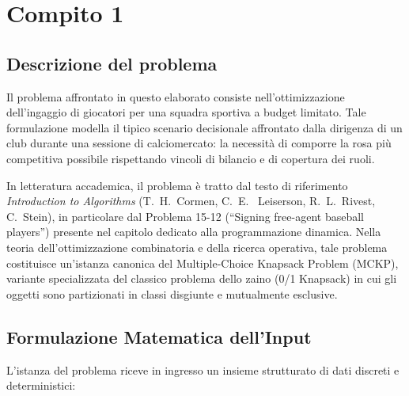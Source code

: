 \documentclass{cisXXX} %
\date{Elaborato a.a. 2025/26 \\[0.3em] Prof.ssa Marina Zanella}
\begin{document}
\maketitle

\section*{Compito 1}                                                                           
\subsection{Descrizione del problema}                                                                                                                                                                               
Il problema affrontato in questo elaborato consiste nell'ottimizzazione dell'ingaggio di giocatori per una squadra sportiva a budget      
limitato. Tale formulazione modella il tipico scenario decisionale affrontato dalla dirigenza di un club durante una sessione di            
calciomercato: la necessità di comporre la rosa più competitiva possibile rispettando vincoli di bilancio e di copertura dei ruoli.         
																																			
In letteratura accademica, il problema è tratto dal testo di riferimento \textit{Introduction to Algorithms} (T.~H.~Cormen, C.~E.         
~Leiserson, R.~L.~Rivest, C.~Stein), in particolare dal Problema 15-12 (``Signing free-agent baseball players'') presente nel capitolo      
dedicato alla programmazione dinamica. Nella teoria dell'ottimizzazione combinatoria e della ricerca operativa, tale problema costituisce   
un'istanza canonica del Multiple-Choice Knapsack Problem (MCKP), variante specializzata del classico problema dello zaino (0/1 Knapsack) in 
cui gli oggetti sono partizionati in classi disgiunte e mutualmente esclusive.

\subsection{Formulazione Matematica dell'Input}                                                                                           
                                                                                                                                              
    L'istanza del problema riceve in ingresso un insieme strutturato di dati discreti e deterministici:                                       
                                                                                                                                              
\end{document}
